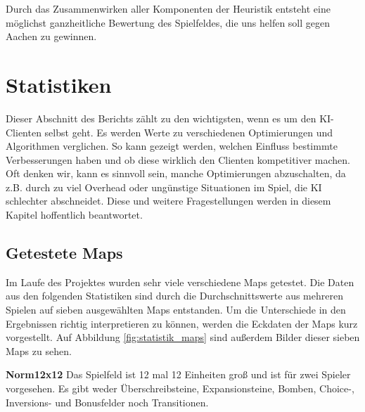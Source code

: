 \documentclass[12pt,a4paper,bibliography=totocnumbered,listof=totocnumbered]{scrartcl}
\begin{document}
	Durch das Zusammenwirken aller Komponenten der Heuristik entsteht eine möglichst ganzheitliche Bewertung des Spielfeldes, die uns helfen soll gegen Aachen zu gewinnen.

    \newpage
    \section{Statistiken}
    \vspace{1em}
	Dieser Abschnitt des Berichts zählt zu den wichtigsten, wenn es um den KI-Clienten selbst geht. Es werden Werte zu verschiedenen Optimierungen und Algorithmen verglichen. So kann gezeigt werden, welchen Einfluss bestimmte \grqq Verbesserungen\glqq{} haben und ob diese wirklich den Clienten kompetitiver machen. Oft denken wir, kann es sinnvoll sein, manche Optimierungen abzuschalten, da z.B. durch zu viel Overhead oder ungünstige Situationen im Spiel, die KI schlechter abschneidet. Diese und weitere Fragestellungen werden in diesem Kapitel hoffentlich beantwortet.\newline

	\subsection{Getestete Maps}
	\vspace{1em}
	Im Laufe des Projektes wurden sehr viele verschiedene Maps getestet. Die Daten aus den folgenden Statistiken sind durch die Durchschnittswerte aus mehreren Spielen auf sieben ausgewählten Maps entstanden. Um die Unterschiede in den Ergebnissen richtig interpretieren zu können, werden die Eckdaten der Maps kurz vorgestellt. Auf Abbildung \ref{fig:statistik_maps} sind außerdem Bilder dieser sieben Maps zu sehen.\newline
	
	\textbf{Norm12x12}\newline
	Das Spielfeld ist 12 mal 12 Einheiten groß und ist für zwei Spieler vorgesehen. Es gibt weder Überschreibsteine, Expansionsteine, Bomben, Choice-, Inversions- und Bonusfelder noch Transitionen.\newline
	
\end{document}

